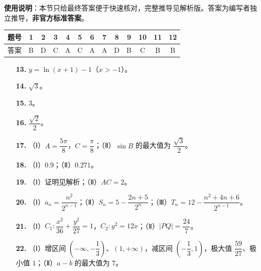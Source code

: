 
\begin{gknotice}
\textbf{使用说明}：本节只给最终答案便于快速核对，完整推导见解析版。答案为编写者独立推导，\textbf{非官方标准答案}。
\end{gknotice}

\begin{center}\begin{tabular}{ccccccccccccc}
\toprule
题号 & 1 & 2 & 3 & 4 & 5 & 6 & 7 & 8 & 9 & 10 & 11 & 12 \\
\midrule
答案 & B & D & C & A & C & A & A & D & B & C & B & B \\
\bottomrule
\end{tabular}\end{center}

\begin{itemize}[leftmargin=2.6em]
  \item[\textbf{13.}] $y=\ln(x+1)-1$（$x>-1$）。
  \item[\textbf{14.}] $\sqrt3$。
  \item[\textbf{15.}] $3$。
  \item[\textbf{16.}] $\dfrac{\sqrt2}2$。
\end{itemize}

\begin{itemize}[leftmargin=2.6em]
  \item[\textbf{17.}] （Ⅰ）$A=\dfrac{5\pi}8$，$C=\dfrac{\pi}8$；（Ⅱ）$\sin B$ 的最大值为 $\dfrac{\sqrt3}2$。
  \item[\textbf{18.}] （Ⅰ）$0.9$；（Ⅱ）$0.271$。
  \item[\textbf{19.}] （Ⅰ）证明见解析；（Ⅱ）$AC=2$。
  \item[\textbf{20.}] （Ⅰ）$a_n=\dfrac{n^2}{2^{n-1}}$；（Ⅱ）$S_n=5-\dfrac{2n+5}{2^n}$；（Ⅲ）$T_n=12-\dfrac{n^2+4n+6}{2^{n-1}}$。
  \item[\textbf{21.}] （Ⅰ）$C_1:\dfrac{x^2}{36}+\dfrac{y^2}{27}=1$，$C_2:y^2=12x$；（Ⅱ）$|PQ|=\dfrac{24}7$。
  \item[\textbf{22.}] （Ⅰ）增区间 $\left(-\infty,-\dfrac13\right)$、$(1,+\infty)$，减区间 $\left(-\dfrac13,1\right)$，极大值 $\dfrac{59}{27}$、极小值 $1$；（Ⅱ）$a-b$ 的最大值为 $7$。
\end{itemize}
